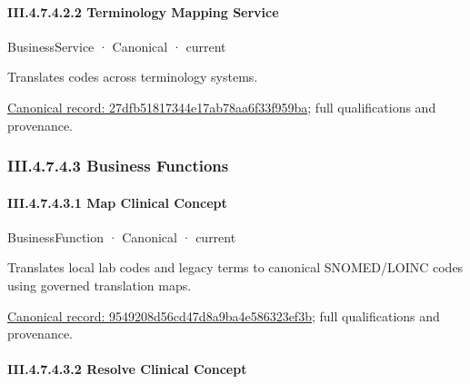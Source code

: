 \paragraph*{III.4.7.4.2.2 Terminology Mapping Service}
\label{navigation:III.4.7.4.2.2}

\label{element:27dfb51817344e17ab78aa6f33f959ba}
{\small BusinessService · Canonical · current}\par

Translates codes across terminology systems.


{\footnotesize \href{../../../../continuum/business/business-service/27dfb51817344e17ab78aa6f33f959ba.md}{Canonical record: 27dfb51817344e17ab78aa6f33f959ba}; full qualifications and provenance.}\par
\subsubsection*{III.4.7.4.3 Business Functions}
\label{navigation:III.4.7.4.3}

\paragraph*{III.4.7.4.3.1 Map Clinical Concept}
\label{navigation:III.4.7.4.3.1}

\label{element:9549208d56cd47d8a9ba4e586323ef3b}
{\small BusinessFunction · Canonical · current}\par

Translates local lab codes and legacy terms to canonical SNOMED/LOINC codes using governed translation maps.


{\footnotesize \href{../../../../continuum/business/business-function/9549208d56cd47d8a9ba4e586323ef3b.md}{Canonical record: 9549208d56cd47d8a9ba4e586323ef3b}; full qualifications and provenance.}\par
\paragraph*{III.4.7.4.3.2 Resolve Clinical Concept}
\label{navigation:III.4.7.4.3.2}


